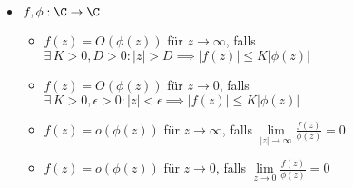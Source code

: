 \begin{itemize}
	\item $ f,\phi: \C \to \C $
	\begin{itemize}
		\item $ f(z) = O(\phi(z)) $ für $ z \to \infty $, falls $ \exists\, K>0, D>0: |z|>D \implies |f(z)| \leq K|\phi(z)| $
		\item $ f(z) = O(\phi(z)) $ für $ z \to 0 $, falls $ \exists\, K>0,\epsilon>0: |z|<\epsilon \implies |f(z)| \leq K|\phi(z)| $
		\item $ f(z) = o(\phi(z)) $ für $ z \to \infty $, falls $ \lim\limits_{|z| \to \infty} \frac{f(z)}{\phi(z)} = 0 $
		\item $ f(z) = o(\phi(z)) $ für $ z \to 0 $, falls $ \lim\limits_{z \to 0} \frac{f(z)}{\phi(z)} = 0 $
	\end{itemize}
\end{itemize}